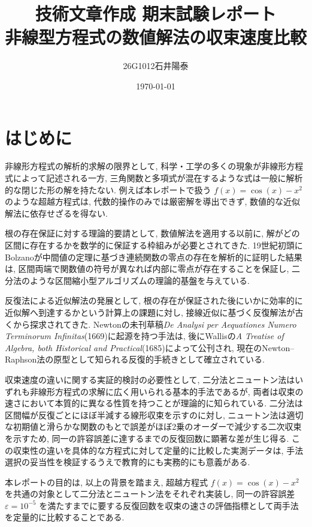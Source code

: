 \documentclass[a4paper,fontsize=11pt,line_length=40zw,number_of_lines=35,baselineskip=1.7zw]{jlreq}
\title{技術文章作成 期末試験レポート \\
  \large 非線型方程式の数値解法の収束速度比較}
\author{26G1012\quad 石井陽泰}
\date{\today}
\begin{document}
\maketitle

\section{はじめに}

非線形方程式の解析的求解の限界として, 科学・工学の多くの現象が非線形方程式によって記述される一方, 三角関数と多項式が混在するような式は一般に解析的な閉じた形の解を持たない.
例えば本レポートで扱う $f(x)=\cos(x)-x^2$ のような超越方程式は, 代数的操作のみでは厳密解を導出できず, 数値的な近似解法に依存せざるを得ない.

根の存在保証に対する理論的要請として, 数値解法を適用する以前に, 解がどの区間に存在するかを数学的に保証する枠組みが必要とされてきた.
19世紀初頭にBolzanoが中間値の定理に基づき連続関数の零点の存在を解析的に証明した結果は, 区間両端で関数値の符号が異なれば内部に零点が存在することを保証し, 二分法のような区間縮小型アルゴリズムの理論的基盤を与えている\cite{bernardReinAnalytischerBeweis1817}.

反復法による近似解法の発展として, 根の存在が保証された後にいかに効率的に近似解へ到達するかという計算上の課題に対し, 接線近似に基づく反復解法が古くから探求されてきた.
Newtonの未刊草稿\emph{De Analysi per Aequationes Numero Terminorum Infinitas}(1669)に起源を持つ手法は, 後にWallisの\emph{A Treatise of Algebra, both Historical and Practical}(1685)によって公刊され, 現在のNewton--Raphson法の原型として知られる反復的手続きとして確立されている\cite{newtonAnalysiAequationesNumero1669,wallisTreatiseAlgebra1685}.

収束速度の違いに関する実証的検討の必要性として, 二分法とニュートン法はいずれも非線形方程式の求解に広く用いられる基本的手法であるが, 両者は収束の速さにおいて本質的に異なる性質を持つことが理論的に知られている.
二分法は区間幅が反復ごとにほぼ半減する線形収束を示すのに対し, ニュートン法は適切な初期値と滑らかな関数のもとで誤差がほぼ2乗のオーダーで減少する二次収束を示すため, 同一の許容誤差に達するまでの反復回数に顕著な差が生じ得る\cite{shaimbetova2025NumericalComparisonBisection}. 
この収束性の違いを具体的な方程式に対して定量的に比較した実測データは, 手法選択の妥当性を検証するうえで教育的にも実務的にも意義がある.

本レポートの目的は, 以上の背景を踏まえ, 超越方程式 $f(x)=\cos(x)-x^2$ を共通の対象として二分法とニュートン法をそれぞれ実装し, 同一の許容誤差 $\varepsilon=10^{-5}$ を満たすまでに要する反復回数を収束の速さの評価指標として両手法を定量的に比較することである.
\end{document}
